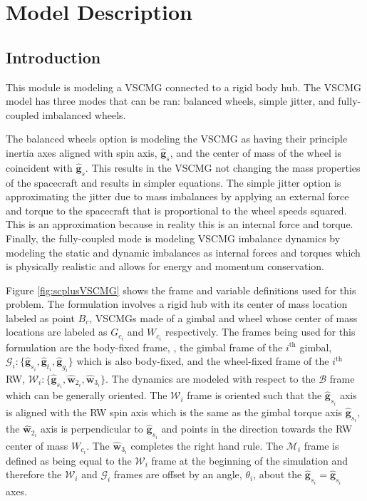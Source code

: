 \section{Model Description}

\subsection{Introduction}

This module is modeling a VSCMG connected to a rigid body hub. The VSCMG model has three modes that can be ran: balanced wheels, simple jitter, and fully-coupled imbalanced wheels.

The balanced wheels option is modeling the VSCMG as having their principle inertia axes aligned with spin axis, $\hat{\bm g}_s$, and the center of mass of the wheel is coincident with $\hat{\bm g}_s$. This results in the VSCMG not changing the mass properties of the spacecraft and results in simpler equations. The simple jitter option is approximating the jitter due to mass imbalances by applying an external force and torque to the spacecraft that is proportional to the wheel speeds squared. This is an approximation because in reality this is an internal force and torque. Finally, the fully-coupled mode is modeling VSCMG imbalance dynamics by modeling the static and dynamic imbalances as internal forces and torques which is physically realistic and allows for energy and momentum conservation.

Figure \ref{fig:scplusVSCMG} shows the frame and variable definitions used for this problem. The formulation involves a rigid hub with its center of mass location labeled as point $B_c$, VSCMGs made of a gimbal and wheel whose center of mass locations are labeled as $G_{c_i}$ and  $W_{c_i}$ respectively. The frames being used for this formulation are the body-fixed frame, , the gimbal frame of the $i^\text{th}$ gimbal, $\mathcal{G}_i:\{\hat{\bm g}_{s_i},\hat{\bm g}_{t_i},\hat{\bm g}_{g_i}\}$ which is also body-fixed, and the wheel-fixed frame of the $i^\text{th}$ RW, $\mathcal{W}_i:\{\hat{\bm g}_{s_i},\hat{\bm w}_{2_i},\hat{\bm w}_{3_i}\}$. The dynamics are modeled with respect to the $\mathcal{B}$ frame which can be generally oriented. The $\mathcal{W}_i$ frame is oriented such that the $\hat{\bm g}_{s_i}$ axis is aligned with the RW spin axis  which is the same as the gimbal torque axis $\hat{\bm g}_{s_{i}}$, the $\hat{\bm w}_{2_i}$ axis is perpendicular to $\hat{\bm g}_{s_i}$ and points in the direction towards the RW center of mass $W_{c_i}$. The $\hat{\bm w}_{3_i}$ completes the right hand rule. The $\mathcal{M}_i$ frame is defined as being equal to the $\mathcal{W}_i$ frame at the beginning of the simulation and therefore the $\mathcal{W}_i$ and $\mathcal{G}_i$ frames are offset by an angle, $\theta_i$, about the $\hat{\bm g}_{s_i} = \hat{\bm g}_{s_i}$ axes.
	
